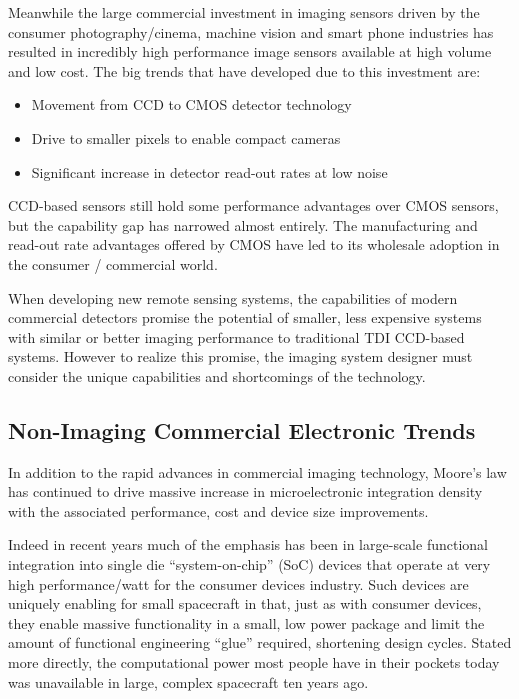 \documentclass[10pt,journal]{IEEEtran}  %
\begin{document}
Meanwhile the large commercial investment in imaging sensors driven by the consumer photography/cinema, machine vision and smart phone industries has resulted in incredibly high performance image sensors available at high volume and low cost.  The big trends that have developed due to this investment are:

\begin{itemize}
    \item Movement from CCD to CMOS detector technology
    \item Drive to smaller pixels to enable compact cameras \cite{isscc2016}
    \item Significant increase in detector read-out rates at low noise
\end{itemize}


CCD-based sensors still hold some performance advantages over CMOS sensors, but the capability gap has narrowed almost entirely. The manufacturing and read-out rate advantages offered by CMOS have led to its wholesale adoption in the consumer / commercial world.

When developing new remote sensing systems, the capabilities of modern commercial detectors promise the potential of smaller, less expensive systems with similar or better imaging performance to traditional TDI CCD-based systems.  However to realize this promise, the imaging system designer must consider the unique capabilities and shortcomings of the technology.

\subsection{Non-Imaging Commercial Electronic Trends}

In addition to the rapid advances in commercial imaging technology, Moore's law has continued to drive massive increase in microelectronic integration density with the associated performance, cost and device size improvements.

Indeed in recent years much of the emphasis has been in large-scale functional integration into single die ``system-on-chip'' (SoC) devices that operate at very high performance/watt for the consumer devices industry.  Such devices are uniquely enabling for small spacecraft in that, just as with consumer devices, they enable massive functionality in a small, low power package and limit the amount of functional engineering ``glue'' required, shortening design cycles.  Stated more directly, the computational power most people have in their pockets today was unavailable in large, complex spacecraft ten years ago.
\end{document}
